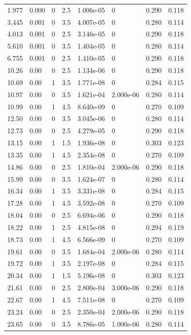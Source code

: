 \documentclass[preview]{standalone}
\begin{document}
{{\begin{tabular}{L{1.2cm}C{1.2cm} C{0.3cm}C{0.5cm} C{1.4cm}C{1.4cm} C{1.4cm}C{1.4cm}}
  1.977  &  0.000  & 0     & 2.5 &  1.006e-05  & 0  & 0.290 &  0.118   \\ 
  3.445  &  0.001  & 0     & 3.5 &  4.007e-05  & 0  & 0.280 &  0.114   \\ 
  4.013  &  0.001  & 0     & 2.5 &  3.146e-05  & 0  & 0.290 &  0.118   \\ 
  5.610  &  0.001  & 0     & 3.5 &  1.404e-05  & 0  & 0.280 &  0.114   \\ 
  6.755  &  0.001  & 0     & 2.5 &  1.410e-05  & 0  & 0.290 &  0.118   \\ 
  10.26  &  0.00  & 0     & 2.5 &  1.134e-06  & 0  & 0.290 &  0.118   \\ 
  10.69  &  0.00  & 1     & 3.5 &  1.771e-08  & 0  & 0.284 &  0.115   \\ 
  10.97  &  0.00  & 0     & 3.5 &  1.621e-04  & 2.000e-06  & 0.280 &  0.114   \\ 
  10.99  &  0.00  & 1     & 4.5 &  8.640e-09  & 0  & 0.270 &  0.109   \\ 
  12.50  &  0.00  & 0     & 3.5 &  3.045e-06  & 0  & 0.280 &  0.114   \\ 
  12.73  &  0.00  & 0     & 2.5 &  4.279e-05  & 0  & 0.290 &  0.118   \\ 
  13.15  &  0.00  & 1     & 1.5 &  1.936e-08  & 0  & 0.303 &  0.123   \\ 
  13.35  &  0.00  & 1     & 4.5 &  2.354e-08  & 0  & 0.270 &  0.109   \\ 
  14.86  &  0.00  & 0     & 2.5 &  1.810e-04  & 2.000e-06  & 0.290 &  0.118   \\ 
  15.99  &  0.00  & 0     & 3.5 &  1.624e-07  & 0  & 0.280 &  0.114   \\ 
  16.34  &  0.00  & 1     & 3.5 &  3.331e-08  & 0  & 0.284 &  0.115   \\ 
  17.28  &  0.00  & 1     & 4.5 &  3.592e-08  & 0  & 0.270 &  0.109   \\ 
  18.04  &  0.00  & 0     & 2.5 &  6.694e-06  & 0  & 0.290 &  0.118   \\ 
  18.22  &  0.00  & 1     & 2.5 &  4.815e-08  & 0  & 0.294 &  0.119   \\ 
  18.73  &  0.00  & 1     & 4.5 &  6.566e-09  & 0  & 0.270 &  0.109   \\ 
  19.61  &  0.00  & 0     & 3.5 &  1.684e-04  & 2.000e-06  & 0.280 &  0.114   \\ 
  19.72  &  0.00  & 1     & 3.5 &  2.197e-08  & 0  & 0.284 &  0.115   \\ 
  20.34  &  0.00  & 1     & 1.5 &  5.196e-08  & 0  & 0.303 &  0.123   \\ 
  21.61  &  0.00  & 0     & 2.5 &  2.800e-04  & 3.000e-06  & 0.290 &  0.118   \\ 
  22.67  &  0.00  & 1     & 4.5 &  7.511e-08  & 0  & 0.270 &  0.109   \\ 
  23.24  &  0.00  & 0     & 2.5 &  2.350e-04  & 2.000e-06  & 0.290 &  0.118   \\ 
  23.65  &  0.00  & 0     & 3.5 &  8.786e-05  & 1.000e-06  & 0.280 &  0.114   \\ 
\hline 
\end{tabular} 

}}
\end{document}
